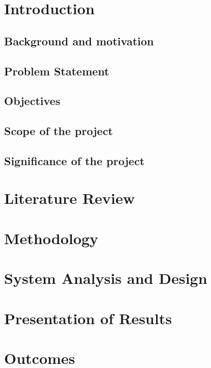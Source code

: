\documentclass[11pt]{report}
\begin{document}
    \chapter{Introduction}\label{ch:introduction}


    \section{Background and motivation}\label{sec:background-and-motivation}
    


    \section{Problem Statement}\label{sec:problem-statement}
    


    \section{Objectives}\label{sec:objectives}
    


    \section{Scope of the project}\label{sec:scope-of-the-project}
    


    \section{Significance of the project}\label{sec:significance-of-the-project}
    


    \chapter{Literature Review}\label{ch:literature-review}
    


    \chapter{Methodology}\label{ch:methodology}
    


    \chapter{System Analysis and Design}\label{ch:system-analysis-and-design}
    


    \chapter{Presentation of Results}\label{ch:results-presentation}
    

    \chapter{Outcomes}\label{ch:outcomes}
    
\end{document}
